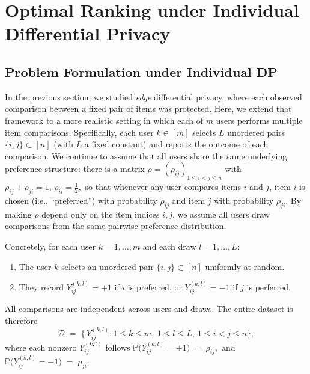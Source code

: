 \documentclass[letterpaper,12pt]{article}
\numberwithin{equation}{section}
\theoremstyle{plain}
\numberwithin{Theorem}{section}
\numberwithin{corollary}{section}
\numberwithin{proposition}{section}
\numberwithin{Lemma}{section}
{
	\theoremstyle{definition}
	\newtheorem{Definition}{Definition}
	\newtheorem{example}{Example}
	\numberwithin{example}{section}
	\newtheorem{fact}{Fact}
	\numberwithin{fact}{section}
	\newtheorem{remark}{Remark}
}
\newcommand{\1}{\mathbbm{1}}
\def\Pr{\mathbb P}
\begin{document}


\vspace{-8mm}
\section{Optimal Ranking under Individual Differential Privacy}
\label{sec: individual-dp-ranking}

\subsection{Problem Formulation under Individual DP} \label{sec: individual dp problem formulation}

In the previous section, we studied \emph{edge} differential privacy, where each observed comparison between a fixed pair of items was protected.  Here, we extend that framework to a more realistic setting in which each of \(m\) users performs multiple item comparisons.  Specifically, each user \(k\in[m]\) selects \(L\) unordered pairs \(\{i,j\}\subset[n]\) (with \(L\) a fixed constant) and reports the outcome of each comparison.  We continue to assume that all users share the same underlying preference structure: there is a matrix \(\rho=(\rho_{ij})_{1\le i<j\le n}\) with
$
\rho_{ij}+\rho_{ji}=1,\,\rho_{ii}=\tfrac12,
$
so that whenever any user compares items \(i\) and \(j\), item \(i\) is chosen (i.e., ``preferred'') with probability \(\rho_{ij}\) and item \(j\) with probability \(\rho_{ji}\).  By making \(\rho\) depend only on the item indices \(i,j\), we assume all users draw comparisons from the same pairwise preference distribution.
 
Concretely, for each user \(k=1,\dots,m\) and each draw \(l=1,\dots,L\):
\begin{enumerate}
	\item The user \(k\) selects an unordered pair \(\{i,j\}\subset[n]\) uniformly at random.
	\item They record \(Y_{ij}^{(k,l)}=+1\) if \(i\) is preferred, or \(Y_{ij}^{(k,l)}=-1\) if \(j\) is perferred.
\end{enumerate}
All comparisons are independent across users and draws.  The entire dataset is therefore
\begin{equation}\label{eq:full-data-set-idp}
\mathcal{D} \;=\; \bigl\{\,Y^{(k,l)}_{ij}: 1\le k\le m,\ 1\le l\le L,\ 1\le i<j\le n\bigr\},
\end{equation}
where each nonzero \(Y_{ij}^{(k,l)}\) follows
$
\Pr\bigl(Y_{ij}^{(k,l)}=+1\bigr)
\;=\;
\rho_{ij},$ and $
\Pr\bigl(Y_{ij}^{(k,l)}=-1\bigr)
\;=\;
\rho_{ji}
$.
\end{document}
